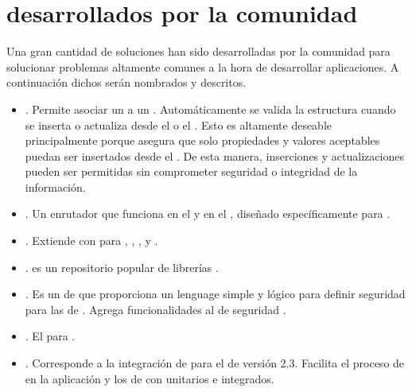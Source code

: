 \section{\packagesAS desarrollados por la comunidad}
Una gran cantidad de soluciones han sido desarrolladas por la comunidad para solucionar problemas altamente comunes a la hora de desarrollar aplicaciones. A continuación dichos \packagesAS serán nombrados y descritos.

	\begin{itemize}
		\item
			\textbf{\nameCollectionTwo}. Permite asociar un \schemaDB a un \mongoCollection. Automáticamente se valida la estructura cuando se inserta o actualiza desde el \clientAS o el \serverAS. Esto es altamente deseable principalmente porque asegura que solo propiedades y valores aceptables puedan ser insertados desde el \clientAS. De esta manera, inserciones y actualizaciones \clientSideAS pueden ser permitidas sin comprometer seguridad o integridad de la información.
		\item
			\textbf{\nameRouter}. Un enrutador que funciona en el \serverAS y en el \browserINT, diseñado específicamente para \meteorNAME.
		\item
			\textbf{\nameCollectionHooks}. Extiende \mongoCollection con \hooksCPT \beforeAfterDB para \insertDB, \updateDB, \removeDB, \findDB y \findOneDB.
		\item
			\textbf{\nameBower}. \bowerIONAME  es un repositorio popular de librerías \javaScriptNAME \clientSideAS.
		\item
			\textbf{\securityPackage}. Es un \packageAS de \meteorNAME que proporciona un lenguage \apiAS simple y lógico para definir seguridad para las \collectionsMETEOR de \mongodbNAME. Agrega funcionalidades al \coreAS de  seguridad \allowdenyCPT.
		\item
			\textbf{\velocityCorePackage}. El \testRunnerCPT \reactive para \meteorNAME.
		\item
			\textbf{\sanjoJasminePackage}. Corresponde a la integración de \meteorNAME \velocityNAME para el \frameworkPC de \testingCPT \jasmineNAME versión 2.3. Facilita el proceso de \testingCPT en la aplicación y los \packageAS de \meteorNAME con \testsCPT unitarios e integrados.

\end{itemize}
